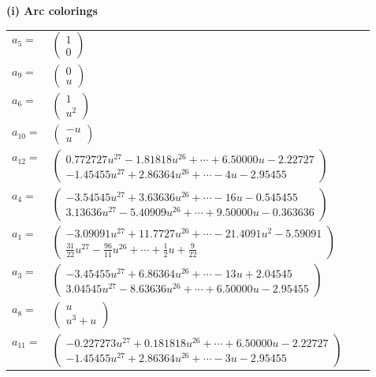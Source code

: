 \documentclass[1p]{elsarticle_modified}
\theoremstyle{definition}
\begin{document}
\flushleft \textbf{(i) Arc colorings}\\
\begin{tabular}{m{7pt} m{180pt} m{7pt} m{180pt} }
\flushright $a_{5}=$&$\begin{pmatrix}1\\0\end{pmatrix}$ \\
\flushright $a_{9}=$&$\begin{pmatrix}0\\u\end{pmatrix}$ \\
\flushright $a_{6}=$&$\begin{pmatrix}1\\u^2\end{pmatrix}$ \\
\flushright $a_{10}=$&$\begin{pmatrix}- u\\u\end{pmatrix}$ \\
\flushright $a_{12}=$&$\begin{pmatrix}0.772727 u^{27}-1.81818 u^{26}+\cdots+6.50000 u-2.22727\\-1.45455 u^{27}+2.86364 u^{26}+\cdots-4 u-2.95455\end{pmatrix}$ \\
\flushright $a_{4}=$&$\begin{pmatrix}-3.54545 u^{27}+3.63636 u^{26}+\cdots-16 u-0.545455\\3.13636 u^{27}-5.40909 u^{26}+\cdots+9.50000 u-0.363636\end{pmatrix}$ \\
\flushright $a_{1}=$&$\begin{pmatrix}-3.09091 u^{27}+11.7727 u^{26}+\cdots-21.4091 u^{2}-5.59091\\\frac{31}{22} u^{27}-\frac{96}{11} u^{26}+\cdots+\frac{1}{2} u+\frac{9}{22}\end{pmatrix}$ \\
\flushright $a_{3}=$&$\begin{pmatrix}-3.45455 u^{27}+6.86364 u^{26}+\cdots-13 u+2.04545\\3.04545 u^{27}-8.63636 u^{26}+\cdots+6.50000 u-2.95455\end{pmatrix}$ \\
\flushright $a_{8}=$&$\begin{pmatrix}u\\u^3+u\end{pmatrix}$ \\
\flushright $a_{11}=$&$\begin{pmatrix}-0.227273 u^{27}+0.181818 u^{26}+\cdots+6.50000 u-2.22727\\-1.45455 u^{27}+2.86364 u^{26}+\cdots-3 u-2.95455\end{pmatrix}$ \\

\end{tabular}
\end{document}
